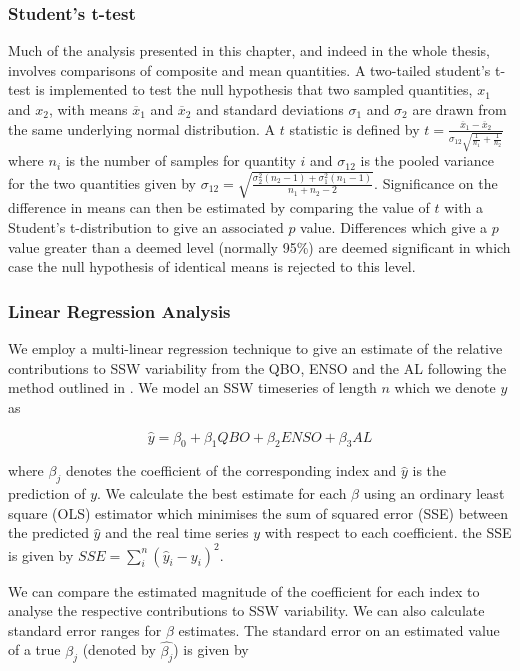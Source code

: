\subsubsection*{Student's t-test}
Much of the analysis presented in this chapter, and indeed in the whole thesis, involves comparisons of composite and mean quantities. A two-tailed student's t-test is implemented to test the null hypothesis that two sampled quantities, $x_1$ and $x_2$, with means $\overline{x}_1$ and $\overline{x}_2$ and standard deviations $\sigma_{1}$ and $\sigma_{2}$ are drawn from the same underlying normal distribution. A $t$ statistic is defined by $t = \frac{\overline{x}_1 - \overline{x}_2}{\sigma_{12} \sqrt{\frac{1}{n_1} + \frac{1}{n_2}}}$ where $n_i$ is the number of samples for quantity $i$ and $\sigma_{12}$ is the pooled variance for the two quantities given by $\sigma_{12} = \sqrt{\frac{\sigma^2_2 (n_2-1) + \sigma^2_1(n_1 - 1)}{n_1+n_2-2}}$. Significance on the difference in means can then be estimated by comparing the value of $t$ with a Student's t-distribution to give an associated $p$ value. Differences which give a $p$ value greater than a deemed level (normally 95\%) are deemed significant in which case the null hypothesis of identical means is rejected to this level.

\subsubsection*{Linear Regression Analysis}
We employ a multi-linear regression technique to give an estimate of the relative contributions to SSW variability from the QBO, ENSO and the AL following the method outlined in \cite{Krzywinski}. We model an SSW timeseries of length $n$ which we denote $y$ as 

\begin{equation} \label{regression}
\hat{y} = \beta_0 + \beta_{1}QBO + \beta_{2}ENSO + \beta_{3}AL
\end{equation}

where $\beta_j$ denotes the coefficient of the corresponding index and $\hat{y}$ is the prediction of $y$. We calculate the best estimate for each $\beta$ using an ordinary least square (OLS) estimator which minimises the sum of squared error (SSE) between the predicted $\hat{y}$ and the real time series $y$ with respect to each coefficient. the SSE is given by $SSE = \sum_i^n{(\hat{y}_i - y_i)^2}$.

We can compare the estimated magnitude of the coefficient for each index to analyse the respective contributions to SSW variability. We can also calculate standard error ranges for $\beta$ estimates. The standard error on an estimated value of a true $\beta_j$ (denoted by $\hat{\beta_j}$) is given by 

